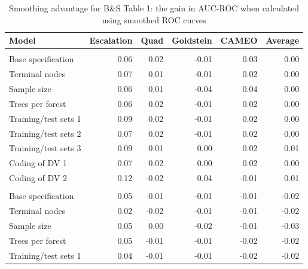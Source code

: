 \documentclass[
]{article}
\begin{document}
\begin{table}

\caption{\label{tab:table1-benefit}Smoothing advantage for B\&S Table 1: the gain in AUC-ROC when calculated using smoothed ROC curves}
\centering
\begin{tabular}[t]{lrrrrr}
\toprule
Model & Escalation & Quad & Goldstein & CAMEO & Average\\
\midrule
\addlinespace[0.3em]
\multicolumn{6}{l}{\textbf{One-month forecasts}}\\
\hspace{1em}Base specification & 0.06 & 0.02 & -0.01 & 0.03 & 0.00\\
\hspace{1em}Terminal nodes & 0.07 & 0.01 & -0.01 & 0.02 & 0.00\\
\hspace{1em}Sample size & 0.06 & 0.01 & -0.04 & 0.04 & 0.00\\
\hspace{1em}Trees per forest & 0.06 & 0.02 & -0.01 & 0.02 & 0.00\\
\hspace{1em}Training/test sets 1 & 0.09 & 0.02 & -0.01 & 0.02 & 0.00\\
\hspace{1em}Training/test sets 2 & 0.07 & 0.02 & -0.01 & 0.02 & 0.00\\
\hspace{1em}Training/test sets 3 & 0.09 & 0.01 & 0.00 & 0.02 & 0.01\\
\hspace{1em}Coding of DV 1 & 0.07 & 0.02 & 0.00 & 0.02 & 0.00\\
\hspace{1em}Coding of DV 2 & 0.12 & -0.02 & 0.04 & -0.01 & 0.01\\
\addlinespace[0.3em]
\multicolumn{6}{l}{\textbf{Six-month forecasts}}\\
\hspace{1em}Base specification & 0.05 & -0.01 & -0.01 & -0.01 & -0.02\\
\hspace{1em}Terminal nodes & 0.02 & -0.02 & -0.01 & -0.01 & -0.02\\
\hspace{1em}Sample size & 0.05 & 0.00 & -0.02 & -0.01 & -0.03\\
\hspace{1em}Trees per forest & 0.05 & -0.01 & -0.01 & -0.02 & -0.02\\
\hspace{1em}Training/test sets 1 & 0.04 & -0.01 & -0.01 & -0.02 & -0.02\\

\end{tabular}
\end{table}
\end{document}
